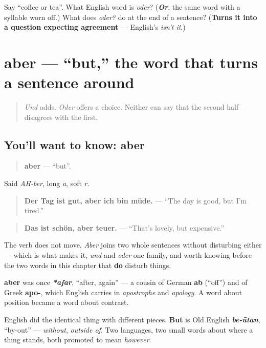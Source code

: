 \begin{tcolorbox}[breakable,colback=teal!4,colframe=teal!35!black,title={Before you move on}]
Say \textquotedblleft{}coffee or tea\textquotedblright{}. What English word is \emph{oder}? (\emph{\textbf{Or}}, the same word with a syllable worn off.) What does \emph{oder?} do at the end of a sentence? (\textbf{Turns it into a question expecting agreement} — English's \emph{isn't it}.)
\end{tcolorbox}
\section[aber]{aber — \textquotedblleft{}but,\textquotedblright{} the word that turns a sentence around}

\label{lesson:GE-C35-aber}



\begin{quote}
\emph{Und} adds. \emph{Oder} offers a choice. Neither can say that the second half disagrees with the first.
\end{quote}

\subsection*{You'll want to know: aber}
\begin{quote}
\textbf{aber} — \textquotedblleft{}but\textquotedblright{}.
\end{quote}

Said \emph{AH-ber}, long \emph{a}, soft \emph{r}.

\begin{quote}
\textbf{Der Tag ist gut, aber ich bin müde.} — \textquotedblleft{}The day is good, but I'm tired.\textquotedblright{}
\end{quote}

\begin{quote}
\textbf{Das ist schön, aber teuer.} — \textquotedblleft{}That's lovely, but expensive.\textquotedblright{}
\end{quote}

The verb does not move. \emph{Aber} joins two whole sentences without disturbing either — which is what makes it, \emph{und} and \emph{oder} one family, and worth knowing before the two words in this chapter that \textbf{do} disturb things.

\begin{cousinweb}
\textbf{aber} was once \emph{\textbf{*afar}}, \textquotedblleft{}after, again\textquotedblright{} — a cousin of German \textbf{ab} (\textquotedblleft{}off\textquotedblright{}) and of Greek \textbf{apo-}, which English carries in \emph{apostrophe} and \emph{apology}. A word about position became a word about contrast.

English did the identical thing with different pieces. \textbf{But} is Old English \emph{\textbf{be-ūtan}}, \textquotedblleft{}by-out\textquotedblright{} — \emph{without}, \emph{outside of}. Two languages, two small words about where a thing stands, both promoted to mean \emph{however}.
\end{cousinweb}

